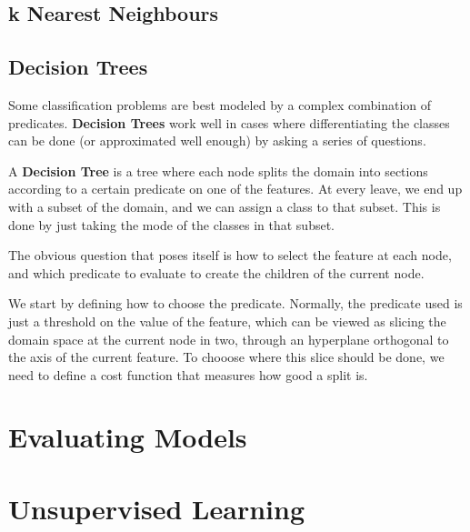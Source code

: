 \documentclass{article}
\begin{document}
\subsection{k Nearest Neighbours}

\subsection{Decision Trees}

Some classification problems are best modeled by a complex combination of predicates.
\textbf{Decision Trees} work well in cases where differentiating the classes can be done (or approximated well enough) by asking a series of questions.

A \textbf{Decision Tree} is a tree where each node splits the domain into sections according to a certain predicate on one of the features.
At every leave, we end up with a subset of the domain, and we can assign a class to that subset.
This is done by just taking the mode of the classes in that subset.

The obvious question that poses itself is how to select the feature at each node, and which predicate to evaluate to create the children of the current node.

We start by defining how to choose the predicate.
Normally, the predicate used is just a threshold on the value of the feature, which can be viewed as slicing the domain space at the current node in two, through an hyperplane orthogonal to the axis of the current feature.
To chooose where this slice should be done, we need to define a cost function that measures how good a split is.

\section{Evaluating Models}

\section{Unsupervised Learning}
\end{document}
